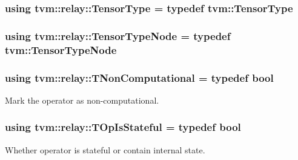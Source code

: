 \subsubsection[{\texorpdfstring{Tensor\+Type}{TensorType}}]{\setlength{\rightskip}{0pt plus 5cm}using {\bf tvm\+::relay\+::\+Tensor\+Type} = typedef {\bf tvm\+::\+Tensor\+Type}}\hypertarget{namespacetvm_1_1relay_a52c13723bba53f4953dfd10c34d480f8}{}\label{namespacetvm_1_1relay_a52c13723bba53f4953dfd10c34d480f8}
\subsubsection[{\texorpdfstring{Tensor\+Type\+Node}{TensorTypeNode}}]{\setlength{\rightskip}{0pt plus 5cm}using {\bf tvm\+::relay\+::\+Tensor\+Type\+Node} = typedef {\bf tvm\+::\+Tensor\+Type\+Node}}\hypertarget{namespacetvm_1_1relay_acfeff91bc774a278a2e9f6103a04387d}{}\label{namespacetvm_1_1relay_acfeff91bc774a278a2e9f6103a04387d}
\subsubsection[{\texorpdfstring{T\+Non\+Computational}{TNonComputational}}]{\setlength{\rightskip}{0pt plus 5cm}using {\bf tvm\+::relay\+::\+T\+Non\+Computational} = typedef bool}\hypertarget{namespacetvm_1_1relay_ab4c835287dfc5ec074ea8431bcebbb17}{}\label{namespacetvm_1_1relay_ab4c835287dfc5ec074ea8431bcebbb17}


Mark the operator as non-\/computational. 

\subsubsection[{\texorpdfstring{T\+Op\+Is\+Stateful}{TOpIsStateful}}]{\setlength{\rightskip}{0pt plus 5cm}using {\bf tvm\+::relay\+::\+T\+Op\+Is\+Stateful} = typedef bool}\hypertarget{namespacetvm_1_1relay_afb8a8d4dd43830d4ce7d566abcd1c450}{}\label{namespacetvm_1_1relay_afb8a8d4dd43830d4ce7d566abcd1c450}


Whether operator is stateful or contain internal state. 

